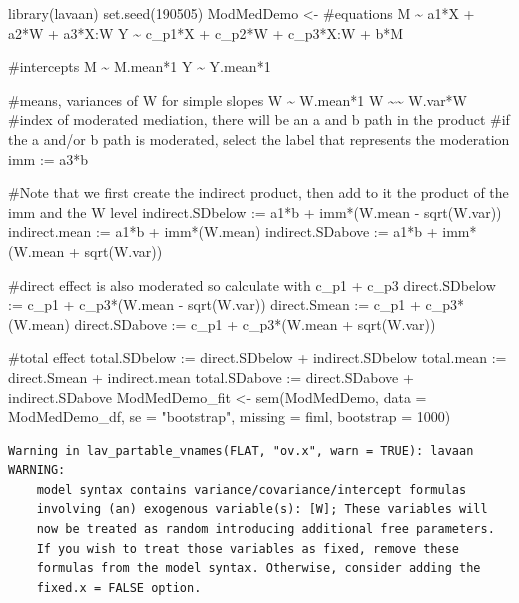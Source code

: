 \documentclass[
]{book}
\newenvironment{Shaded}{\begin{snugshade}}{\end{snugshade}}
\newcommand{\AttributeTok}[1]{\textcolor[rgb]{0.77,0.63,0.00}{#1}}
\newcommand{\DecValTok}[1]{\textcolor[rgb]{0.00,0.00,0.81}{#1}}
\newcommand{\FunctionTok}[1]{\textcolor[rgb]{0.00,0.00,0.00}{#1}}
\newcommand{\NormalTok}[1]{#1}
\newcommand{\OtherTok}[1]{\textcolor[rgb]{0.56,0.35,0.01}{#1}}
\newcommand{\StringTok}[1]{\textcolor[rgb]{0.31,0.60,0.02}{#1}}
\begin{document}
\begin{Shaded}
\begin{Highlighting}[]
\FunctionTok{library}\NormalTok{(lavaan)}
\FunctionTok{set.seed}\NormalTok{(}\DecValTok{190505}\NormalTok{)}
\NormalTok{ModMedDemo }\OtherTok{\textless{}{-}} \StringTok{\textquotesingle{}}
\StringTok{    \#equations}
\StringTok{    M \textasciitilde{} a1*X + a2*W + a3*X:W}
\StringTok{    Y \textasciitilde{} c\_p1*X + c\_p2*W + c\_p3*X:W + b*M}

\StringTok{    \#intercepts}
\StringTok{    M \textasciitilde{} M.mean*1}
\StringTok{    Y \textasciitilde{} Y.mean*1}

\StringTok{    \#means, variances of W for simple slopes}
\StringTok{    W \textasciitilde{} W.mean*1}
\StringTok{    W \textasciitilde{}\textasciitilde{} W.var*W}
\StringTok{    }
\StringTok{    \#index of moderated mediation, there will be an a and b path in the product}
\StringTok{    \#if the a and/or b path is moderated, select the label that represents the moderation}
\StringTok{    imm := a3*b}

\StringTok{    \#Note that we first create the indirect product, then add to it the product of the imm and the W level}
\StringTok{    indirect.SDbelow := a1*b + imm*(W.mean {-} sqrt(W.var))}
\StringTok{    indirect.mean := a1*b + imm*(W.mean)}
\StringTok{    indirect.SDabove := a1*b + imm*(W.mean + sqrt(W.var))}

\StringTok{    \#direct effect is also moderated so calculate with c\_p1 + c\_p3}
\StringTok{    direct.SDbelow := c\_p1 + c\_p3*(W.mean {-} sqrt(W.var)) }
\StringTok{    direct.Smean := c\_p1 + c\_p3*(W.mean)}
\StringTok{    direct.SDabove := c\_p1 + c\_p3*(W.mean + sqrt(W.var))}

\StringTok{    \#total effect}
\StringTok{    total.SDbelow := direct.SDbelow + indirect.SDbelow}
\StringTok{    total.mean := direct.Smean + indirect.mean}
\StringTok{    total.SDabove := direct.SDabove + indirect.SDabove}
\StringTok{ \textquotesingle{}}
\NormalTok{ModMedDemo\_fit }\OtherTok{\textless{}{-}} \FunctionTok{sem}\NormalTok{(ModMedDemo, }\AttributeTok{data =}\NormalTok{ ModMedDemo\_df, }\AttributeTok{se =} \StringTok{"bootstrap"}\NormalTok{, }\AttributeTok{missing =} \StringTok{\textquotesingle{}fiml\textquotesingle{}}\NormalTok{, }\AttributeTok{bootstrap =} \DecValTok{1000}\NormalTok{)}
\end{Highlighting}
\end{Shaded}

\begin{verbatim}
Warning in lav_partable_vnames(FLAT, "ov.x", warn = TRUE): lavaan WARNING:
    model syntax contains variance/covariance/intercept formulas
    involving (an) exogenous variable(s): [W]; These variables will
    now be treated as random introducing additional free parameters.
    If you wish to treat those variables as fixed, remove these
    formulas from the model syntax. Otherwise, consider adding the
    fixed.x = FALSE option.
\end{verbatim}
\end{document}
